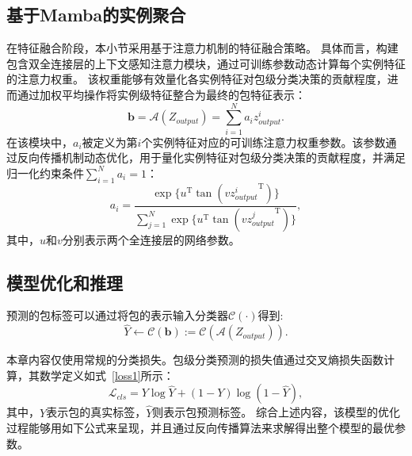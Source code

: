 \subsection[\hspace{-2pt}基于Mamba的实例聚合]{{\heiti{} \hspace{-8pt}基于Mamba的实例聚合}}\label{section3: 基于Mamba的实例聚合}

在特征融合阶段，本小节采用基于注意力机制的特征融合策略。
具体而言，构建包含双全连接层的上下文感知注意力模块，通过可训练参数动态计算每个实例特征的注意力权重。
该权重能够有效量化各实例特征对包级分类决策的贡献程度，进而通过加权平均操作将实例级特征整合为最终的包特征表示：
\begin{equation}
  \mathbf{b}=\mathcal{A}(Z_{output})=\sum_{i=1}^{N}a_iz^i_{output}.
\end{equation}
在该模块中，$a_i$被定义为第$i$个实例特征对应的可训练注意力权重参数。该参数通过反向传播机制动态优化，用于量化实例特征对包级分类决策的贡献程度，并满足归一化约束条件$\sum_{i=1}^{N}a_i = 1$：
\begin{equation}
  a_{i}=\frac{\exp\{u^{\mathrm{T}}\tan(v{z^i_{output}}^{\mathrm{T}})\}}{\sum_{j=1}^{N} \exp\{u^{\mathrm{T}}\tan(v{z^j_{output}}^{\mathrm{T}})\}}, 
\end{equation}
其中，$u$和$v$分别表示两个全连接层的网络参数。

\subsection[\hspace{-2pt}模型优化和推理]{{\heiti{} \hspace{-8pt}模型优化和推理}}\label{section3: 模型优化和推理}

预测的包标签可以通过将包的表示输入分类器$\mathcal{C}\left(\cdot\right)$得到:
\begin{equation}
  \hat{Y}\gets\mathcal{C}\left(\mathbf{b}\right):= \mathcal{C}(\mathcal{A}(Z_{output})).
\end{equation}

本章内容仅使用常规的分类损失。包级分类预测的损失值通过交叉熵损失函数计算，其数学定义如式~\ref{loss1}所示：
\begin{equation}
  \mathcal{L}_{cls}=Y \log\hat{Y}+(1-Y)\log(1-\hat{Y}),
  \label{loss1}
\end{equation}
其中，$Y$表示包的真实标签，$\hat{Y}$则表示包预测标签。
综合上述内容，该模型的优化过程能够用如下公式来呈现，并且通过反向传播算法来求解得出整个模型的最优参数。

